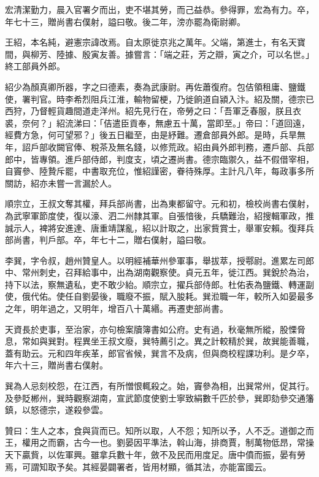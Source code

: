 \begin{pinyinscope}
 宏清潔勤力，晨入官署夕而出，吏不堪其勞，而己益恭。參得罪，宏為有力。卒，年七十三，贈尚書右僕射，謚曰敬。後二年，滂亦罷為衛尉卿。



 王紹，本名純，避憲宗諱改焉。自太原徙京兆之萬年。父端，第進士，有名天寶間，與柳芳、陸據、殷寅友善。據嘗言：「端之莊，芳之辯，寅之介，可以名世。」終工部員外郎。



 紹少為顏真卿所器，字之曰德素，奏為武康尉。再佐蕭復府。包佶領租庸、鹽鐵使，署判官。時李希烈阻兵江淮，輸物留梗，乃徙餉道自潁入汴。紹及關，德宗已西狩，乃督輕貨趣間道走洋州。紹先見行在，帝勞之曰：「吾軍乏春服，朕且衣裘，奈何？」紹流涕曰：「佶遣臣貢奉，無慮五十萬，當即至。」帝曰：「道回遠，經費方急，何可望邪？」後五日繼至，由是紓難。遷倉部員外郎。是時，兵旱無年，詔戶部收闕官俸、稅茶及無名錢，以修荒政。紹由員外郎判務，遷戶部、兵部郎中，皆專領。進戶部侍郎，判度支，頃之遷尚書。德宗臨禦久，益不假借宰相，自竇參、陸贄斥罷，中書取充位，惟紹謹密，眷待殊厚。主計凡八年，每政事多所關訪，紹亦未嘗一言漏於人。



 順宗立，王叔文奪其權，拜兵部尚書，出為東都留守。元和初，檢校尚書右僕射，為武寧軍節度使，復以濠、泗二州隸其軍。自張愔後，兵驕難治，紹搜輯軍政，推誠示人，裨將安進達、唐重靖謀亂，紹以計取之，出家貲賞士，舉軍安賴。復拜兵部尚書，判戶部。卒，年七十二，贈右僕射，謚曰敬。



 李巽，字令叔，趙州贊皇人。以明經補華州參軍事，舉拔萃，授鄠尉。進累左司郎中、常州刺史，召拜給事中，出為湖南觀察使。貞元五年，徙江西。巽銳於為治，持下以法，察無遺私，吏不敢少紿。順宗立，擢兵部侍郎。杜佑表為鹽鐵、轉運副使，俄代佑。使任自劉晏後，職廢不振，賦入朘耗。巽涖職一年，較所入如晏最多之年，明年過之，又明年，增百八十萬緡。再遷吏部尚書。



 天資長於吏事，至治家，亦句檢案牘簿書如公府。史有過，秋毫無所縱，股慄脅息，常如與巽對。程異坐王叔文廢，巽特薦引之。異之計較精於巽，故巽能善職，蓋有助云。元和四年疾革，郎官省候，巽言不及病，但與商校程課功利。是夕卒，年六十三，贈尚書右僕射。



 巽為人忌刻校怨，在江西，有所憎恨輒殺之。始，竇參為相，出巽常州，促其行。及參貶郴州，巽時觀察湖南，宣武節度使劉士寧致絹數千匹於參，巽即劾參交通籓鎮，以怒德宗，遂殺參雲。



 贊曰：生人之本，食與貨而已。知所以取，人不怨；知所以予，人不乏。道御之而王，權用之而霸，古今一也。劉晏因平準法，斡山海，排商賈，制萬物低昂，常操天下贏貲，以佐軍興。雖拿兵數十年，斂不及民而用度足。唐中僨而振，晏有勞焉，可謂知取予矣。其經晏闢署者，皆用材顯，循其法，亦能富國云。



\end{pinyinscope}